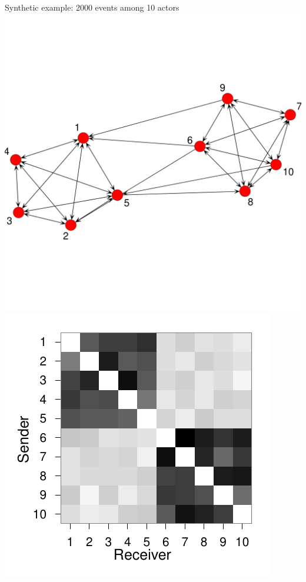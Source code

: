 \documentclass{beamer}
\begin{document}
\begin{frame}{Synthetic example: 2000 events among 10 actors}
\includegraphics[scale=.12]{../../figs/synthetic/network}
\includegraphics[scale=.7]{../../figs/synthetic/mat}
\end{frame}
\end{document}
